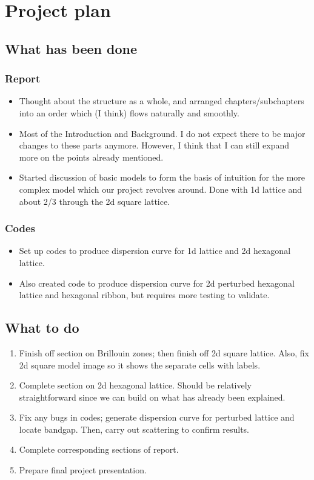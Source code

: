 \chapter{Project plan}

\section{What has been done}

\subsection{Report}
\begin{itemize}
  \item Thought about the structure as a whole, and arranged
        chapters/subchapters into an order which (I think) flows naturally and
        smoothly.
  \item Most of the Introduction and Background. I do not expect there to be
        major changes to these parts anymore. However, I think that I can still
        expand more on the points already mentioned.
  \item Started discussion of basic models to form the basis of intuition for
        the more complex model which our project revolves around. Done with 1d
        lattice and about 2/3 through the 2d square lattice.
\end{itemize}

\subsection{Codes}
\begin{itemize}
  \item Set up codes to produce dispersion curve for 1d lattice and 2d
        hexagonal lattice.
  \item Also created code to produce dispersion curve for 2d perturbed
        hexagonal lattice and hexagonal ribbon, but requires more testing to
        validate. 
\end{itemize}

\section{What to do}
\begin{enumerate}
  \item Finish off section on Brillouin zones; then finish off 2d square
        lattice. Also, fix 2d square model image so it shows the separate
        cells with labels.
  \item Complete section on 2d hexagonal lattice. Should be relatively
        straightforward since we can build on what has already been explained.
  \item Fix any bugs in codes; generate dispersion curve for perturbed lattice
        and locate bandgap. Then, carry out scattering to confirm results.
  \item Complete corresponding sections of report.
  \item Prepare final project presentation.
\end{enumerate}

